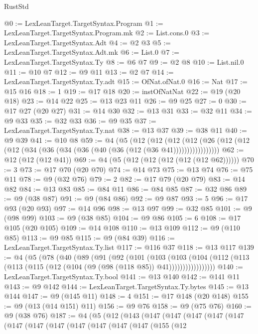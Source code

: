 \begin{lexlean}{RustStd}
\begin{coremodule}
@0 := LexLeanTarget.TargetSyntax.Program
@1 := LexLeanTarget.TargetSyntax.Program.mk
@2 := List.cons.{0}
@3 := LexLeanTarget.TargetSyntax.Adt
@4 := @2 @3
@5 := LexLeanTarget.TargetSyntax.Adt.mk
@6 := List.{0}
@7 := LexLeanTarget.TargetSyntax.Ty
@8 := @6 @7
@9 := @2 @8
@10 := List.nil.{0}
@11 := @10 @7
@12 := @9 @11
@13 := @2 @7
@14 := LexLeanTarget.TargetSyntax.Ty.adt
@15 := OfNat.ofNat.{0}
@16 := Nat
@17 := @15 @16
@18 := 1
@19 := @17 @18
@20 := instOfNatNat
@22 := @19 (@20 @18)
@23 := @14 @22
@25 := @13 @23 @11
@26 := @9 @25
@27 := 0
@30 := @17 @27 (@20 @27)
@31 := @14 @30
@32 := @13 @31
@33 := @32 @11
@34 := @9 @33
@35 := @32 @33
@36 := @9 @35
@37 := LexLeanTarget.TargetSyntax.Ty.nat
@38 := @13 @37
@39 := @38 @11
@40 := @9 @39
@41 := @10 @8
@59 := @4
    (@5
      (@12
        (@12
          (@12 (@12 (@26 (@12 (@12 (@12 (@34 (@36 (@34 (@36 (@40 (@36 (@12 (@36 @41)))))))))))))))))
@62 := @12 (@12 (@12 @41))
@69 := @4 (@5 (@12 (@12 (@12 (@12 (@12 @62))))))
@70 := 3
@73 := @17 @70 (@20 @70)
@74 := @14 @73
@75 := @13 @74
@76 := @75 @11
@78 := @9 (@32 @76)
@79 := 2
@82 := @17 @79 (@20 @79)
@83 := @14 @82
@84 := @13 @83
@85 := @84 @11
@86 := @84 @85
@87 := @32 @86
@89 := @9 (@38 @87)
@91 := @9 (@84 @86)
@92 := @9 @87
@93 := 5
@96 := @17 @93 (@20 @93)
@97 := @14 @96
@98 := @13 @97
@99 := @32 @85
@101 := @9 (@98 @99)
@103 := @9 (@38 @85)
@104 := @9 @86
@105 := 6
@108 := @17 @105 (@20 @105)
@109 := @14 @108
@110 := @13 @109
@112 := @9 (@110 @85)
@113 := @9 @85
@115 := @9 (@84 @39)
@116 := LexLeanTarget.TargetSyntax.Ty.list
@117 := @116 @37
@118 := @13 @117
@139 := @4
    (@5
      (@78
        (@40
          (@89
            (@91
              (@92
                (@101
                  (@103
                    (@103
                      (@104
                        (@112 (@113 (@113 (@115 (@12 (@104 (@9 (@98 (@118 @85)) @41)))))))))))))))))
@140 := LexLeanTarget.TargetSyntax.Ty.bool
@141 := @13 @140
@142 := @141 @11
@143 := @9 @142
@144 := LexLeanTarget.TargetSyntax.Ty.bytes
@145 := @13 @144
@147 := @9 (@145 @11)
@148 := 4
@151 := @17 @148 (@20 @148)
@155 := @9 (@13 (@14 @151) @11)
@156 := @9 @76
@158 := @9 (@75 @76)
@160 := @9 (@38 @76)
@187 := @4
    (@5
      (@12
        (@143
          (@147
            (@147
              (@147
                (@147
                  (@147
                    (@147
                      (@147
                        (@147
                          (@147
                            (@147
                              (@147
                                (@147
                                  (@155
                                    (@12

\end{coremodule}
\end{lexlean}
